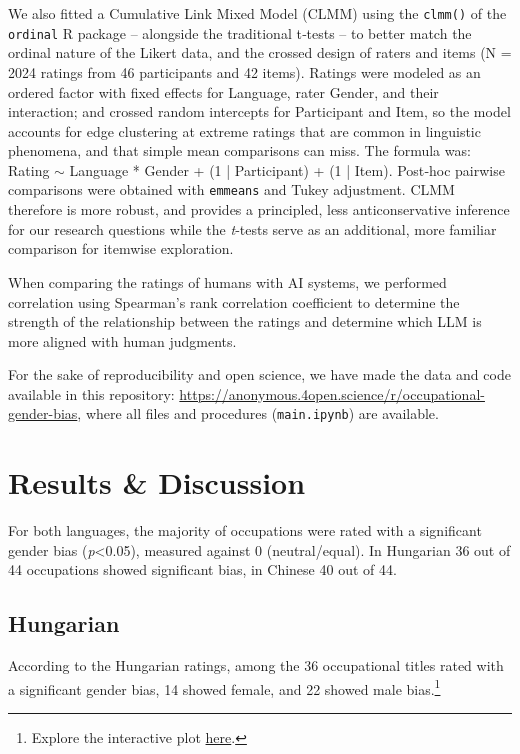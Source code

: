 \documentclass[10pt, a4paper]{article}
\begin{document}
We also fitted a Cumulative Link Mixed Model (CLMM) using the \texttt{clmm()} of the \texttt{ordinal} R package -- alongside the traditional t‑tests -- to better match the ordinal nature of the Likert data, and the crossed design of raters and items (N = 2024 ratings from 46 participants and 42 items). Ratings were modeled as an ordered factor with fixed effects for Language, rater Gender, and their interaction; and crossed random intercepts for Participant and Item, so the model accounts for edge clustering at extreme ratings that are common in linguistic phenomena, and that simple mean comparisons can miss. The formula was: Rating $\sim$ Language * Gender + (1 | Participant) + (1 | Item). Post‑hoc pairwise comparisons were obtained with \texttt{emmeans} and Tukey adjustment. CLMM therefore is more robust, and provides a principled, less anticonservative inference for our research questions while the \textit{t}‑tests serve as an additional, more familiar comparison for itemwise exploration.

When comparing the ratings of humans with AI systems, we performed correlation using Spearman's rank correlation coefficient to determine the strength of the relationship between the ratings and determine which LLM is more aligned with human judgments. 

For the sake of reproducibility and open science, we have made the data and code available in this repository: \href{https://anonymous.4open.science/r/occupational-gender-bias}{https://anonymous.4open.science/r/occupational-gender-bias}, where all files and procedures (\texttt{main.ipynb}) are available.

\section{Results \& Discussion}\label{sec:results}

For both languages, the majority of occupations were rated with a significant gender bias (\textit{p}<0.05), measured against 0 (neutral/equal). In Hungarian 36 out of 44 occupations showed significant bias, in Chinese 40 out of 44.

\subsection{Hungarian}

According to the Hungarian ratings, among the 36 occupational titles rated with a significant gender bias, 14 showed female, and 22 showed male bias.\footnote{Explore the interactive plot \href{https://anonymous.4open.science/api/repo/occupational-gender-bias/file/occupations_hu.html?v=009c96af}{here}.}
\end{document}
